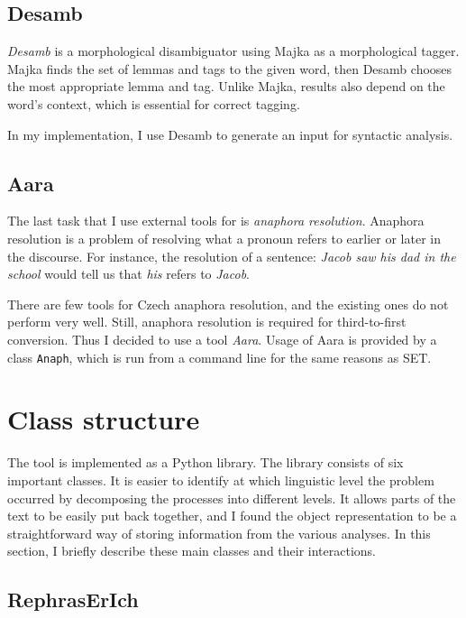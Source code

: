 \subsection{Desamb}

\emph{Desamb} is a morphological disambiguator using Majka as a morphological tagger. Majka finds the set of lemmas and tags to the given word, then Desamb chooses the most appropriate lemma and tag. Unlike Majka, results also depend on the word's context, which is essential for correct tagging.

In my implementation, I use Desamb to generate an input for syntactic analysis.

\subsection{Aara}

The last task that I use external tools for is \emph{anaphora resolution}. Anaphora resolution is a problem of resolving what a pronoun refers to earlier or later in the discourse. For instance, the resolution of a sentence: \emph{Jacob saw his dad in the school} would tell us that \emph{his} refers to \emph{Jacob}.

There are few tools for Czech anaphora resolution, and the existing ones do not perform very well. Still, anaphora resolution is required for third-to-first conversion. Thus I decided to use a tool \emph{Aara}. Usage of Aara is provided by a class \texttt{Anaph}, which is run from a command line for the same reasons as SET.

\section{Class structure}

The tool is implemented as a Python library. The library consists of six important classes. It is easier to identify at which linguistic level the problem occurred by decomposing the processes into different levels. It allows parts of the text to be easily put back together, and I found the object representation to be a straightforward way of storing information from the various analyses. In this section, I briefly describe these main classes and their interactions.

\subsection{RephrasErIch}

